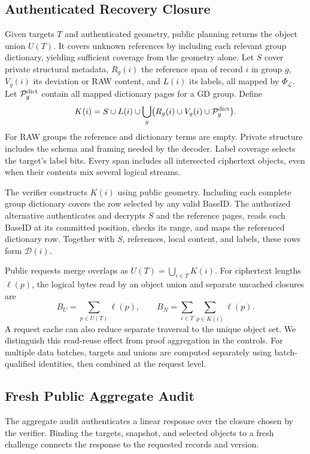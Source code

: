 \documentclass[10pt,journal]{IEEEtran}
\begin{document}
\subsection{Authenticated Recovery Closure}\label{sec:c2}
Given targets $T$ and authenticated geometry, public planning returns the
object union $U(T)$. It covers unknown references by including each relevant
group dictionary, yielding sufficient coverage from the geometry alone. Let $S$ cover private structural metadata, $R_g(i)$ the reference span of
record $i$ in group $g$, $V_g(i)$ its deviation or RAW content, and $L(i)$
its labels, all mapped by $\Phi_{\mathcal L}$. Let $\mathcal P_g^{\rm dict}$
contain all mapped dictionary pages for a GD group. Define
\begin{equation}\label{eq:closure}
K(i)=S\cup L(i)\cup\bigcup_g
\bigl(R_g(i)\cup V_g(i)\cup\mathcal P_g^{\rm dict}\bigr).
\end{equation}
For RAW groups the reference and dictionary terms are empty. Private
structure includes the schema and framing needed by the decoder. Label
coverage selects the target's label bits. Every span includes all intersected
ciphertext objects, even when their contents mix several logical streams.

The verifier constructs $K(i)$ using public geometry. Including each
complete group dictionary covers the row selected by any valid BaseID.
The authorized alternative authenticates and decrypts $S$ and the reference
pages, reads each BaseID at its committed position, checks its range, and
maps the referenced dictionary row. Together with $S$, references, local
content, and labels, these rows form $\mathcal D(i)$.

Public requests merge overlaps as $U(T)=\bigcup_{i\in T}K(i)$.
For ciphertext lengths $\ell(p)$, the logical bytes read by an object union
and separate uncached closures are
\begin{equation}\label{eq:reads}
B_U=\sum_{p\in U(T)}\ell(p),\qquad
B_N=\sum_{i\in T}\sum_{p\in K(i)}\ell(p).
\end{equation}
A request cache can also reduce separate traversal to the unique object set.
We distinguish this read-reuse effect from proof aggregation in the controls.
For multiple data batches, targets and unions are computed separately using
batch-qualified identities, then combined at the request level.

\subsection{Fresh Public Aggregate Audit}\label{sec:audit}
The aggregate audit authenticates a linear response over the closure chosen
by the verifier. Binding the targets, snapshot, and selected objects to a
fresh challenge connects the response to the requested records and version.
\end{document}
